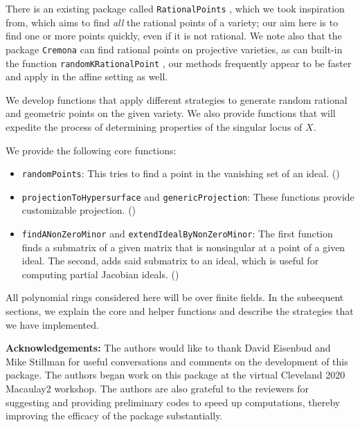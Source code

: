 \documentclass[11pt]{amsart}
\theoremstyle{definition}
\begin{document}
    There is an existing package called {\tt RationalPoints} \cite{RationalPointsSource}, which we took inspiration from, which aims to find \emph{all} the rational points of a variety; our aim here is to find one or more points quickly, even if it is not rational.  We note also that the package {\tt Cremona} \cite{CremonaSource} can find rational points on projective varieties, as can built-in the function {\tt randomKRationalPoint} \cite{M2}, our methods frequently appear to be faster and apply in the affine setting as well.

    We develop functions that apply different strategies to generate random rational and geometric points on the given variety. We also provide functions that will expedite the process of determining properties of the singular locus of $X$.%

    We provide the following core functions:
    \begin{itemize}    
    \item {\tt randomPoints}:  This tries to find a point in the vanishing set of an ideal. ()
    \item {\tt projectionToHypersurface} and {\tt genericProjection}: These functions provide customizable projection. () 	
    \item {\tt findANonZeroMinor} and {\tt extendIdealByNonZeroMinor}:  The first function finds a submatrix of a given matrix that is nonsingular at a point of a given ideal.  The second, adds said submatrix to an ideal, which is useful for computing partial Jacobian ideals.  ()          
    \end{itemize}

    All polynomial rings considered here will be over finite fields. In the subsequent sections, we explain  the core and helper functions and describe the strategies that we have implemented.

   \vspace{1em}
    \noindent \textbf{Acknowledgements:} The authors would like to thank David Eisenbud and Mike Stillman for useful conversations and comments on the development of this package.  The authors began work on this package at the virtual Cleveland 2020 Macaulay2 workshop. The authors are also grateful to the reviewers for suggesting and providing preliminary codes to speed up computations, thereby improving the efficacy of the package substantially. 
\end{document}
